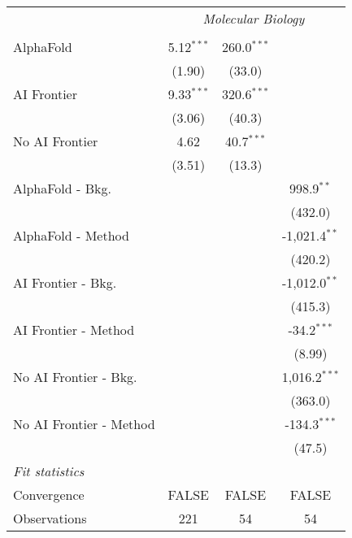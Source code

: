 \begin{tabular}{lccc}
 & \multicolumn{3}{c}{\textit{Molecular Biology}} \\ \\
   AlphaFold               & 5.12$^{***}$ & 260.0$^{***}$ &   \\   
                           & (1.90)       & (33.0)        &   \\   
   AI Frontier             & 9.33$^{***}$ & 320.6$^{***}$ &   \\   
                           & (3.06)       & (40.3)        &   \\   
   No AI Frontier          & 4.62         & 40.7$^{***}$  &   \\   
                           & (3.51)       & (13.3)        &   \\   
   AlphaFold - Bkg.        &              &               & 998.9$^{**}$\\   
                           &              &               & (432.0)\\   
   AlphaFold - Method      &              &               & -1,021.4$^{**}$\\   
                           &              &               & (420.2)\\   
   AI Frontier - Bkg.      &              &               & -1,012.0$^{**}$\\   
                           &              &               & (415.3)\\   
   AI Frontier - Method    &              &               & -34.2$^{***}$\\   
                           &              &               & (8.99)\\   
   No AI Frontier - Bkg.   &              &               & 1,016.2$^{***}$\\   
                           &              &               & (363.0)\\   
   No AI Frontier - Method &              &               & -134.3$^{***}$\\   
                           &              &               & (47.5)\\   
   \midrule
   \emph{Fit statistics}\\
   Convergence             &FALSE         & FALSE         & FALSE\\  
   Observations            & 221          & 54            & 54\\  
   

\end{tabular}
